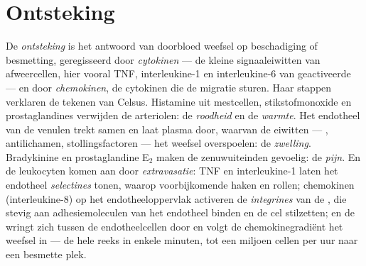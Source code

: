 \section{Ontsteking}

\begin{definition}\label{def:b3:innate-immunity:inflammation}
De \emph{ontsteking} is het antwoord van doorbloed weefsel op
beschadiging of besmetting, geregisseerd door \emph{cytokinen} --- de
kleine signaaleiwitten van afweercellen, hier vooral TNF,
interleukine-1 en interleukine-6 van geactiveerde  --- en
door \emph{chemokinen}, de cytokinen die de migratie sturen. Haar
stappen verklaren de tekenen van Celsus. Histamine uit mestcellen,
stikstofmonoxide en prostaglandines verwijden de arteriolen: de
\emph{roodheid} en de \emph{warmte}. Het endotheel van de venulen trekt
samen en laat plasma door, waarvan de eiwitten --- ,
antilichamen, stollingsfactoren --- het weefsel overspoelen: de
\emph{zwelling}. Bradykinine en prostaglandine E$_{2}$ maken de
zenuwuiteinden gevoelig: de \emph{pijn}. En de leukocyten komen aan
door \emph{extravasatie}: TNF en interleukine-1 laten het endotheel
\emph{selectines} tonen, waarop voorbijkomende  haken en
rollen; chemokinen (interleukine-8) op het endotheeloppervlak
activeren de \emph{integrines} van de , die stevig aan
adhesiemoleculen van het endotheel binden en de cel stilzetten; en de
 wringt zich tussen de endotheelcellen door en volgt de
chemokinegradiënt het weefsel in --- de hele reeks in enkele minuten,
tot een miljoen cellen per uur naar een besmette plek.
\end{definition}

